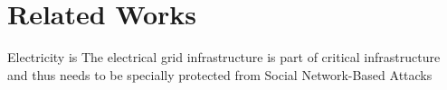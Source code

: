 \chapter{Related Works}

Electricity is 
The electrical grid infrastructure is part of critical infrastructure and thus
needs to be specially protected from
Social Network-Based Attacks 